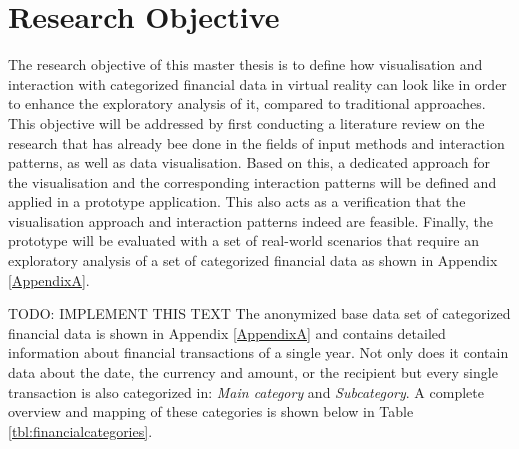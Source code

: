 
\section{Research Objective}

The research objective of this master thesis is to define how visualisation and interaction with categorized financial data in virtual reality can look like in order to enhance the exploratory analysis of it, compared to traditional approaches. \newline
This objective will be addressed by first conducting a literature review on the research that has already bee done in the fields of input methods and interaction patterns, as well as data visualisation. Based on this, a dedicated approach for the visualisation and the corresponding interaction patterns will be defined and applied in a prototype application. This also acts as a verification that the visualisation approach and interaction patterns indeed are feasible. Finally, the prototype will be evaluated with a set of real-world scenarios that require an exploratory analysis of a set of categorized financial data as shown in Appendix \ref{AppendixA}.



TODO: IMPLEMENT THIS TEXT
The anonymized base data set of categorized financial data is shown in Appendix \ref{AppendixA} and contains detailed information about financial transactions of a single year. Not only does it contain data about the date, the currency and amount, or the recipient but every single transaction is also categorized in: \textit{Main category} and \textit{Subcategory}. A complete overview and mapping of these categories is shown below in Table \ref{tbl:financialcategories}.






